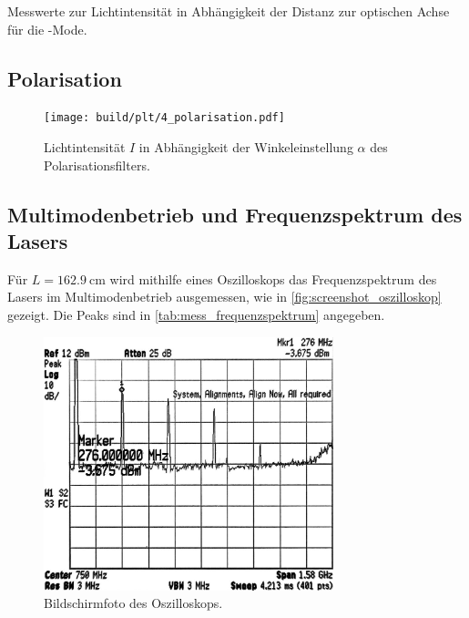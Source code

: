 \begin{table}
  \centering
  \caption{Messwerte zur Lichtintensität in Abhängigkeit der Distanz zur optischen Achse für die -Mode.}
  \label{tab:mess_tem_01}
\end{table}


\subsection{Polarisation}
\lipsum[1]

\begin{figure}
  \centering
   \texttt{[image: build/plt/4\_polarisation.pdf]}
   \caption{Lichtintensität $I$ in Abhängigkeit der Winkeleinstellung $\alpha$ des Polarisationsfilters.}
   \label{fig:plt:polarisation}
\end{figure}


\subsection{Multimodenbetrieb und Frequenzspektrum des Lasers}
Für $L = \SI{162.9}{\centi\meter}$ wird mithilfe eines Oszilloskops das Frequenzspektrum des Lasers im Multimodenbetrieb ausgemessen,
wie in \autoref{fig:screenshot_oszilloskop} gezeigt.
Die Peaks sind in \autoref{tab:mess_frequenzspektrum} angegeben.

\begin{figure}
  \centering
   \includegraphics[width=0.75\textwidth]{content/img/5_frequenzspektrum_oszilloskop_inverted.jpg}
   \caption{Bildschirmfoto des Oszilloskops.}
   \label{fig:screenshot_oszilloskop}
\end{figure}

